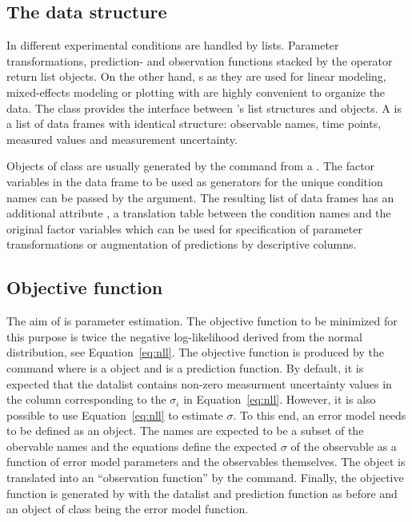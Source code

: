 \documentclass[article]{jss}
\begin{document}
\subsection{The data structure}

In  different experimental conditions are handled by lists. Parameter transformations, prediction- and observation functions stacked by the  operator return list objects. On the other hand, s as they are used for linear modeling, mixed-effects modeling or plotting with  are highly convenient to organize the data.
The class  provides the interface between 's list structures and  objects.
A  is a list of data frames with identical structure: observable names, time points, measured values and measurement uncertainty.

Objects of class  are usually generated by the  command from a . The factor variables in the data frame to be used as generators for the unique condition names can be passed by the  argument. The resulting list of data frames has an additional attribute , a translation table between the condition names and the original factor variables which can be used for specification of parameter transformations or augmentation of predictions by descriptive columns.


\subsection{Objective function}


The aim of  is parameter estimation. The objective function to be minimized for this purpose is twice the negative log-likelihood derived from the normal distribution, see Equation~\ref{eq:nll}. The objective function is produced by the command  where  is a  object and  is a prediction function. By default, it is expected that the datalist contains non-zero measurment uncertainty values in the  column corresponding to the $\sigma_i$ in Equation~\ref{eq:nll}. However, it is also possible to use  Equation~\ref{eq:nll} to estimate $\sigma$. To this end, an error model needs to be defined as an  object. The names are expected to be a subset of the obervable names and the equations define the expected $\sigma$ of the observable as a function of error model parameters and the observables themselves. The  object is translated into an ``observation function'' by the  command. Finally, the objective function is generated by  with the datalist and prediction function as before and an object  of class  being the error model function.
\end{document}

